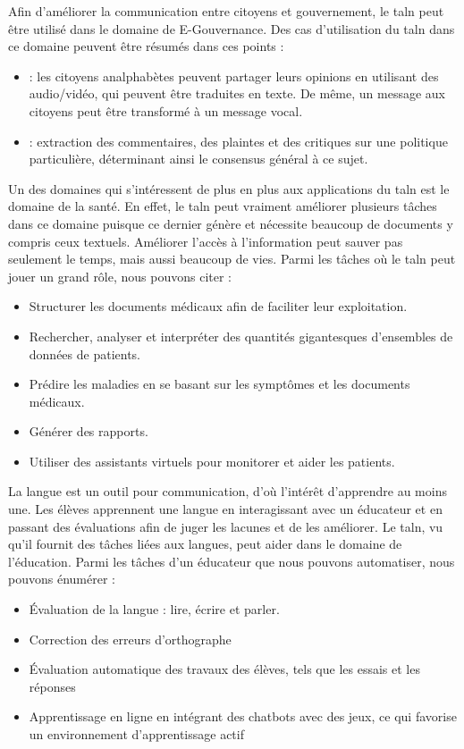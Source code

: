 \documentclass{KodeBook}
\begin{document}
Afin d'améliorer la communication entre citoyens et gouvernement, le \ac{taln} peut être utilisé dans le domaine de E-Gouvernance.
Des cas d'utilisation du \ac{taln} dans ce domaine peuvent être résumés dans ces points :
\begin{itemize}
	\item {} : les citoyens analphabètes peuvent partager leurs opinions en utilisant des audio/vidéo, qui peuvent être traduites en texte. De même, un message aux citoyens peut être transformé à un message vocal.
	\item {} : extraction des commentaires, des plaintes et des critiques sur une politique particulière, déterminant ainsi le consensus général à ce sujet.
\end{itemize}

Un des domaines qui s'intéressent de plus en plus aux applications du \ac{taln} est le domaine de la santé.
En effet, le \ac{taln} peut vraiment améliorer plusieurs tâches dans ce domaine puisque ce dernier génère et nécessite beaucoup de documents y compris ceux textuels.
Améliorer l'accès à l'information peut sauver pas seulement le temps, mais aussi beaucoup de vies.
Parmi les tâches où le \ac{taln} peut jouer un grand rôle, nous pouvons citer :
\begin{itemize}
	\item Structurer les documents médicaux afin de faciliter leur exploitation.
	\item Rechercher, analyser et interpréter des quantités gigantesques d'ensembles de données de patients.
	\item Prédire les maladies en se basant sur les symptômes et les documents médicaux.
	\item Générer des rapports.
	\item Utiliser des assistants virtuels pour monitorer et aider les patients.
\end{itemize}

La langue est un outil pour communication, d'où l'intérêt d'apprendre au moins une. 
Les élèves apprennent une langue en interagissant avec un éducateur et en passant des évaluations afin de juger les lacunes et de les améliorer. 
Le \ac{taln}, vu qu'il fournit des tâches liées aux langues, peut aider dans le domaine de l'éducation.
Parmi les tâches d'un éducateur que nous pouvons automatiser, nous pouvons énumérer :
\begin{itemize}
	\item Évaluation de la langue : lire, écrire et parler.
	\item Correction des erreurs d'orthographe 
	\item Évaluation automatique des travaux des élèves, tels que les essais et les réponses
	\item Apprentissage en ligne en intégrant des chatbots avec des jeux, ce qui favorise un environnement d'apprentissage actif
\end{itemize}
\end{document}

